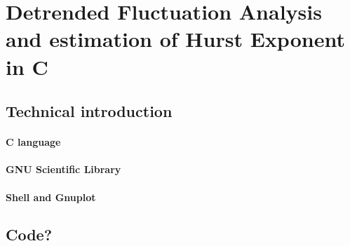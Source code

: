 \section{Detrended Fluctuation Analysis and estimation of Hurst Exponent in C}
\subsection{Technical introduction}
\paragraph{C language}
\paragraph{GNU Scientific Library}
\paragraph{Shell and Gnuplot}

\subsection{Code?}
